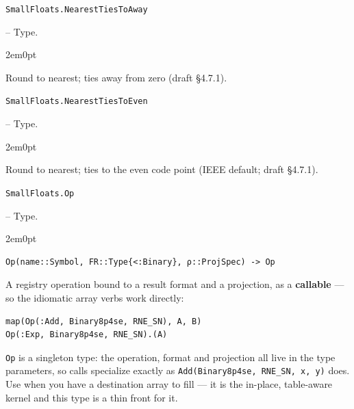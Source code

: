 \par\medskip\noindent\begin{minipage}{\linewidth}
\hypertarget{4095773949561946178}{\texttt{SmallFloats.NearestTiesToAway}}  -- {Type.}
\nopagebreak
\begin{adjustwidth}{2em}{0pt}

Round to nearest; ties away from zero (draft §4.7.1).



\end{adjustwidth}
\end{minipage}
\par\medskip

\par\medskip\noindent\begin{minipage}{\linewidth}
\hypertarget{13007042087745522853}{\texttt{SmallFloats.NearestTiesToEven}}  -- {Type.}
\nopagebreak
\begin{adjustwidth}{2em}{0pt}

Round to nearest; ties to the even code point (IEEE default; draft §4.7.1).



\end{adjustwidth}
\end{minipage}
\par\medskip

\par\medskip\noindent\begin{minipage}{\linewidth}
\hypertarget{9195041457639280132}{\texttt{SmallFloats.Op}}  -- {Type.}
\nopagebreak
\begin{adjustwidth}{2em}{0pt}


\begin{verbatim}
Op(name::Symbol, FR::Type{<:Binary}, ρ::ProjSpec) -> Op
\end{verbatim}

A registry operation bound to a result format and a projection, as a \textbf{callable} — so the idiomatic array verbs work directly:


\nopagebreak[4]
\begin{verbatim}
map(Op(:Add, Binary8p4se, RNE_SN), A, B)
Op(:Exp, Binary8p4se, RNE_SN).(A)
\end{verbatim}

\texttt{Op} is a singleton type: the operation, format and projection all live in the type parameters, so calls specialize exactly as \texttt{Add(\allowbreak{}Binary8p4se, RNE\_\allowbreak{}SN, x, y)} does. Use  when you have a destination array to fill — it is the in-place, table-aware kernel and this type is a thin front for it.



\end{adjustwidth}
\end{minipage}
\par\medskip

